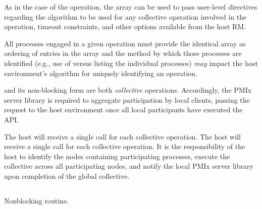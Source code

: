 As in the case of the  operation, the  array can be used to pass user-level directives regarding the algorithm to be used for any collective operation involved in the operation, timeout constraints, and other options available from the host \ac{RM}.

\adviceuserstart
All processes engaged in a given  operation must provide the identical  array as ordering of entries in the array and the method by which those processes are identified (e.g., use of  versus listing the individual processes) \textit{may} impact the host environment's algorithm for uniquely identifying an operation.
\adviceuserend

\adviceimplstart
{} and its non-blocking form are both \emph{collective} operations. Accordingly, the \ac{PMIx} server library is required to aggregate participation by local clients, passing the request to the host environment once all local participants have executed the \ac{API}.
\adviceimplend

\advicermstart
The host will receive a single call for each collective operation. The host will receive a single call for each collective operation. It is the responsibility of the host to identify the nodes containing participating processes, execute the collective across all participating nodes, and notify the local \ac{PMIx} server library upon completion of the global collective.

\advicermend


\subsection{}

\summary

Nonblocking  routine.

\format


